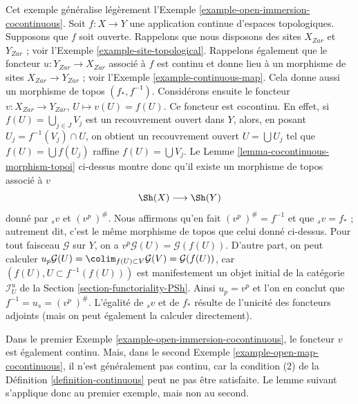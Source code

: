 \begin{example}
\label{example-open-map-cocontinuous}
Cet exemple généralise légèrement
l’Exemple \ref{example-open-immersion-cocontinuous}.
Soit $f : X \to Y$ une application continue d’espaces topologiques.
Supposons que $f$ soit ouverte.
Rappelons que nous disposons des sites $X_{Zar}$ et $Y_{Zar}$ ; voir
l’Exemple \ref{example-site-topological}.
Rappelons également que le foncteur $u : Y_{Zar} \to X_{Zar}$ associé à $f$
est continu et donne lieu à un morphisme de sites
$X_{Zar} \to Y_{Zar}$ ; voir l’Exemple \ref{example-continuous-map}.
Cela donne aussi un morphisme de topos $(f_*, f^{-1})$.
Considérons ensuite le foncteur
$v : X_{Zar} \to Y_{Zar}$, $U \mapsto v(U) = f(U)$.
Ce foncteur est cocontinu. En effet, si
$f(U) = \bigcup_{j \in J} V_j$ est un recouvrement ouvert dans $Y$, alors, en
posant $U_j = f^{-1}(V_j) \cap U$, on obtient un recouvrement ouvert
$U = \bigcup U_j$ tel que $f(U) = \bigcup f(U_j)$ raffine
$f(U) = \bigcup V_j$.
Le Lemme \ref{lemma-cocontinuous-morphism-topoi} ci-dessus montre donc qu’il
existe un morphisme de topos associé à $v$
$$
\Sh(X) \longrightarrow \Sh(Y)
$$
donné par ${}_sv$ et $(v^p\ )^\#$. Nous affirmons qu’en fait
$(v^p\ )^\# = f^{-1}$ et que ${}_sv = f_*$ ; autrement dit, c’est le même
morphisme de topos que celui donné ci-dessus. Pour tout faisceau
$\mathcal{G}$ sur $Y$, on a
$v^p\mathcal{G}(U) = \mathcal{G}(f(U))$.
D’autre part, on peut calculer
$u_p\mathcal{G}(U) = \colim_{f(U) \subset V} \mathcal{G}(V)
= \mathcal{G}(f(U))$, car $(f(U), U \subset f^{-1}(f(U)))$ est manifestement
un objet initial de la catégorie $\mathcal{I}_U^u$ de la
Section \ref{section-functoriality-PSh}.
Ainsi $u_p = v^p$ et l’on en conclut que
$f^{-1} = u_s = (v^p\ )^\#$.
L’égalité de ${}_sv$ et de $f_*$ résulte de l’unicité des foncteurs adjoints
(mais on peut également la calculer directement).
\end{example}

\noindent
Dans le premier Exemple \ref{example-open-immersion-cocontinuous}, le
foncteur $v$ est également continu. Mais, dans le second
Exemple \ref{example-open-map-cocontinuous}, il n’est généralement pas
continu, car la condition (2) de la Définition \ref{definition-continuous}
peut ne pas être satisfaite. Le lemme suivant s’applique donc au premier
exemple, mais non au second.

